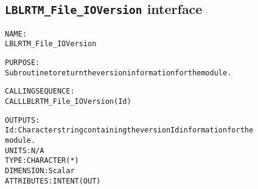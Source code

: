 \subsection{\texttt{LBLRTM\_File\_IOVersion} interface}
  \label{sec:LBLRTM_File_IOVersion_interface}
  \begin{alltt}
 
  NAME:
        LBLRTM_File_IOVersion
 
  PURPOSE:
        Subroutine to return the version information for the module.
 
  CALLING SEQUENCE:
        CALL LBLRTM_File_IOVersion( Id )
 
  OUTPUTS:
        Id:     Character string containing the version Id information for the
                module.
                UNITS:      N/A
                TYPE:       CHARACTER(*)
                DIMENSION:  Scalar
                ATTRIBUTES: INTENT(OUT)
 
  \end{alltt}
